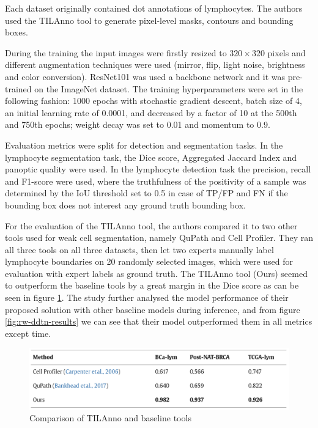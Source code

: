 Each dataset originally contained dot annotations of lymphocytes. The authors used the TILAnno tool to generate pixel-level masks, contours and bounding boxes.

During the training the input images were firstly resized to $320\!\times\!320$ pixels and different augmentation techniques were used (mirror, flip, light noise, brightness and color conversion). ResNet101 was used a backbone network and it was pre-trained on the ImageNet dataset. The training hyperparameters were set in the following fashion: 1000 epochs with stochastic gradient descent, batch size of 4, an initial learning rate of 0.0001, and decreased by a factor of 10 at the 500th and 750th epochs; weight decay was set to 0.01 and momentum to 0.9.

Evaluation metrics were split for detection and segmentation tasks. In the lymphocyte segmentation task, the Dice score, Aggregated Jaccard Index and panoptic quality were used. In the lymphocyte detection task the precision, recall and F1-score were used, where the truthfulness of the positivity of a sample was determined by the IoU threshold set to 0.5 in case of TP/FP and FN if the bounding box does not interest any ground truth bounding box.

For the evaluation of the TILAnno tool, the authors compared it to two other tools used for weak cell segmentation, namely QuPath and Cell Profiler. They ran all three tools on all three datasets, then let two experts manually label lymphocyte boundaries on 20 randomly selected images, which were used for evaluation with expert labels as ground truth. The TILAnno tool (Ours) seemed to outperform the baseline tools by a great margin in the Dice score as can be seen in figure \ref{fig:rw-ddtn-tilanno}. The study further analysed the model performance of their proposed solution with other baseline models during inference, and from figure \ref{fig:rw-ddtn-results} we can see that their model outperformed them in all metrics except time.

\begin{figure}[H]
    \begin{centering}
    \includegraphics[width=14cm]{assets/images/rw-ddtn-tilanno-eval.png}
    \par\end{centering}
    \caption{Comparison of TILAnno and baseline tools}
    \label{fig:rw-ddtn-tilanno}
\end{figure}


